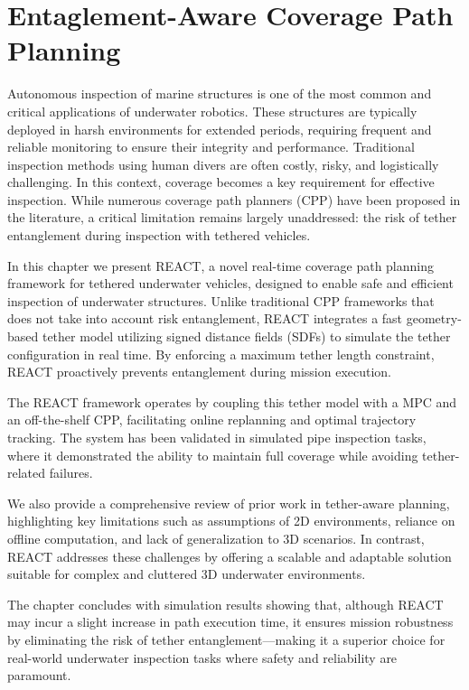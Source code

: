 \chapter{Entaglement-Aware Coverage Path Planning}
\label{ch:react}

Autonomous inspection of marine structures is one of the most common and critical applications of underwater robotics. These structures are typically deployed in harsh environments for extended periods, requiring frequent and reliable monitoring to ensure their integrity and performance. Traditional inspection methods using human divers are often costly, risky, and logistically challenging. In this context, coverage becomes a key requirement for effective inspection. While numerous coverage path planners (CPP) have been proposed in the literature, a critical limitation remains largely unaddressed: the risk of tether entanglement during inspection with tethered vehicles.
 
 In this chapter we present REACT, a novel real-time coverage path planning framework for tethered underwater vehicles, designed to enable safe and efficient inspection of underwater structures. Unlike traditional CPP frameworks that does not take into account risk entanglement, REACT integrates a fast geometry-based tether model utilizing signed distance fields (SDFs) to simulate the tether configuration in real time. By enforcing a maximum tether length constraint, REACT proactively prevents entanglement during mission execution.

The REACT framework operates by coupling this tether model with a MPC and an off-the-shelf CPP, facilitating online replanning and optimal trajectory tracking. The system has been validated in simulated pipe inspection tasks, where it demonstrated the ability to maintain full coverage while avoiding tether-related failures.

We also provide a comprehensive review of prior work in tether-aware planning, highlighting key limitations such as assumptions of 2D environments, reliance on offline computation, and lack of generalization to 3D scenarios. In contrast, REACT addresses these challenges by offering a scalable and adaptable solution suitable for complex and cluttered 3D underwater environments.

The chapter concludes with simulation results showing that, although REACT may incur a slight increase in path execution time, it ensures mission robustness by eliminating the risk of tether entanglement—making it a superior choice for real-world underwater inspection tasks where safety and reliability are paramount. 